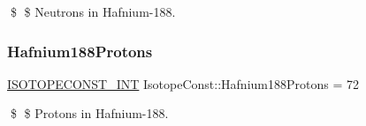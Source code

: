 \$ \$ Neutrons in Hafnium-\/188. \mbox{\label{group___isotope_const-_hafnium-_hf188_ga321927ed1afe34b18d69528320087a98}} 
\subsubsection{\texorpdfstring{Hafnium188\+Protons}{Hafnium188Protons}}
{\footnotesize\ttfamily \mbox{\hyperlink{group___isotope_const-_macros_ga5f18360b3e99483a35c32d789e62621c}{I\+S\+O\+T\+O\+P\+E\+C\+O\+N\+S\+T\+\_\+\+I\+NT}} Isotope\+Const\+::\+Hafnium188\+Protons = 72}

\$ \$ Protons in Hafnium-\/188. 
